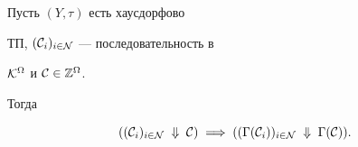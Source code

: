 \begin{props}


Пусть $(Y,\tau)$ есть хаусдорфово


ТП, $({\cal C}_i)_{i \in {\cal N}}$ --- последовательность в


${\cal K}^{\Omega}$ и ${\cal C} \in {{\Bbb Z}^{\Omega}}$.


Тогда


\begin{equation}


(({\cal C}_i)_{i \in {\cal N}}\;\Downarrow\;{\cal C})\;\Longrightarrow\;


(({{\Gamma}({\cal C}_i)})_{i \in {\cal N}}\;\Downarrow\;


{\Gamma}({\cal C})).


\end{equation}


\end{props}






